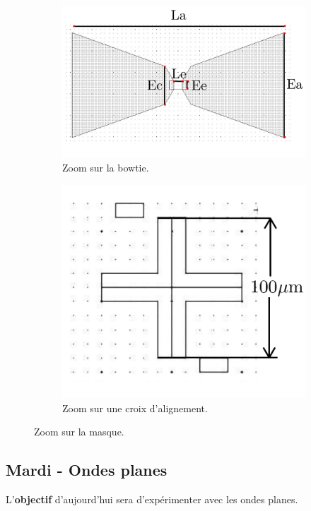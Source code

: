\begin{figure}[h!]
    \centering
    \begin{subfigure}[b]{0.4\textwidth}
        \centering
        \includegraphics[width=0.8\linewidth]{texfigures/waffer_bowtie.png}
        \caption{\label{fig:waffer_bowtie} Zoom sur la bowtie.}
    \end{subfigure}
    \begin{subfigure}[b]{0.4\textwidth}
        \centering
        \includegraphics[width=0.8\linewidth]{texfigures/waffer_cross.png}
        \caption{\label{fig:waffer_cross} Zoom sur une croix d'alignement.}
    \end{subfigure}
    \caption{Zoom sur la masque.}
\end{figure}

\subsection{Mardi - Ondes planes}

L'\textbf{objectif} d'aujourd'hui sera d'expérimenter
avec les ondes planes.

